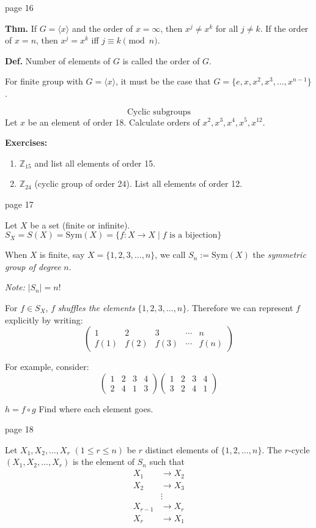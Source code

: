 \documentclass{article}
\begin{document}
\newpage
\noindent page 16

\textbf{Thm.} If $G = \langle x \rangle$ and the order of $x = \infty$, then $x^j \neq x^k$ for all $j \neq k$. If the order of $x = n$, then $x^j = x^k$ iff $j \equiv k \pmod{n}$.

\textbf{Def.} Number of elements of $G$ is called the order of $G$.

For finite group with $G = \langle x \rangle$, it must be the case that $G = \{e, x, x^2, x^3, \ldots, x^{n-1}\}$.

\[
\text{Cyclic subgroups}
\]
Let $x$ be an element of order 18. Calculate orders of $x^2, x^3, x^4, x^5, x^{12}$.

\textbf{Exercises:}
\begin{enumerate}
    \item $\mathbb{Z}_{15}$ and list all elements of order 15.
    \item $\mathbb{Z}_{24}$ (cyclic group of order 24). List all elements of order 12.
\end{enumerate}

\newpage
\noindent page 17

Let $X$ be a set (finite or infinite). $S_X = S(X) = \text{Sym}(X) = \{ f : X \to X \mid f \text{ is a bijection} \}$

When $X$ is finite, say $X = \{ 1, 2, 3, \ldots, n \}$, we call $S_n := \text{Sym}(X)$ the \textit{symmetric group of degree} $n$.

\textit{Note:} $|S_n| = n!$

For $f \in S_X$, $f$ \textit{shuffles the elements} $\{ 1, 2, 3, \ldots, n \}$. Therefore we can represent $f$ explicitly by writing:
\[
\begin{pmatrix}
1 & 2 & 3 & \cdots & n \\
f(1) & f(2) & f(3) & \cdots & f(n)
\end{pmatrix}
\]

For example, consider:
\[
\begin{pmatrix}
1 & 2 & 3 & 4 \\
2 & 4 & 1 & 3
\end{pmatrix}
\begin{pmatrix}
1 & 2 & 3 & 4 \\
3 & 2 & 4 & 1
\end{pmatrix}
\]

$h = f \circ g$ Find where each element goes.

\newpage
\noindent page 18

Let $X_1, X_2, \ldots, X_r$ $(1 \leq r \leq n)$ be $r$ distinct elements of $\{ 1, 2, \ldots, n \}$. The $r$-cycle $(X_1, X_2, \ldots, X_r)$ is the element of $S_n$ such that
\[
\begin{aligned}
    X_1 &\to X_2 \\
    X_2 &\to X_3 \\
    &\vdots \\
    X_{r-1} &\to X_r \\
    X_r &\to X_1
\end{aligned}
\]
\end{document}

